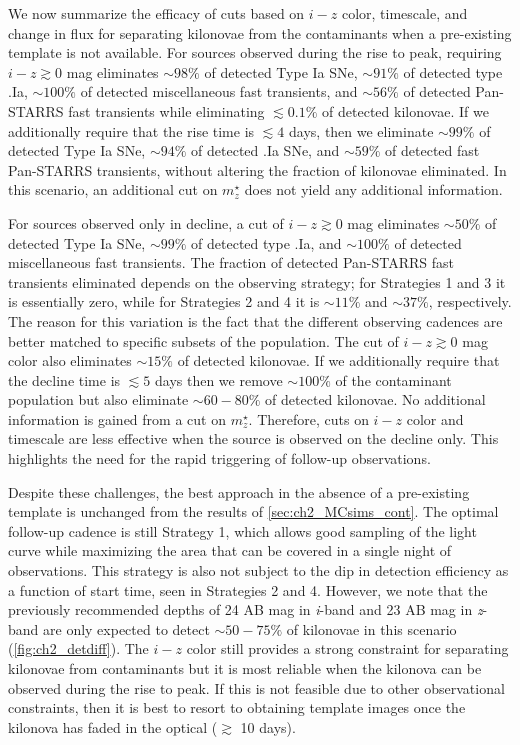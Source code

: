 We now summarize the efficacy of cuts based on $i-z$ color, timescale, and change in flux for separating kilonovae from the contaminants when a pre-existing template is not available. For sources observed during the rise to peak, requiring $i-z\gtrsim0$ mag eliminates $\sim98\%$ of detected Type Ia SNe, $\sim91\%$ of detected type .Ia, $\sim100\%$ of detected miscellaneous fast transients, and $\sim 56\%$ of detected Pan-STARRS fast transients while eliminating $\lesssim0.1\%$ of detected kilonovae. If we additionally require that the rise time is $\lesssim4$ days, then we eliminate $\sim99\%$ of detected Type Ia SNe, $\sim94\%$ of detected .Ia SNe, and $\sim59\%$ of detected fast Pan-STARRS transients, without altering the fraction of kilonovae eliminated. In this scenario, an additional cut on $m^{\star}_z$ does not yield any additional information.

For sources observed only in decline, a cut of $i-z\gtrsim0$ mag eliminates $\sim50\%$ of detected Type Ia SNe, $\sim99\%$ of detected type .Ia, and $\sim 100\%$ of detected miscellaneous fast transients. The fraction of detected Pan-STARRS fast transients eliminated depends on the observing strategy; for Strategies 1 and 3 it is essentially zero, while for Strategies 2 and 4 it is $\sim11\%$ and $\sim37\%$, respectively. The reason for this variation is the fact that the different observing cadences are better matched to specific subsets of the population. The cut of $i-z\gtrsim0$ mag color also eliminates $\sim 15\%$ of detected kilonovae. If we additionally require that the decline time is $\lesssim 5$ days then we remove $\sim100\%$ of the contaminant population but also eliminate $\sim60-80\%$ of detected kilonovae. No additional information is gained from a cut on $m^{\star}_z$. Therefore, cuts on $i-z$ color and timescale are less effective when the source is observed on the decline only. This highlights the need for the rapid triggering of follow-up observations.

Despite these challenges, the best approach in the absence of a pre-existing template is unchanged from the results of \autoref{sec:ch2_MCsims_cont}. The optimal follow-up cadence is still Strategy 1, which allows good sampling of the light curve while maximizing the area that can be covered in a single night of observations. This strategy is also not subject to the dip in detection efficiency as a function of start time, seen in Strategies 2 and 4. However, we note that the previously recommended depths of 24 AB mag in {\em i}-band and 23 AB mag in {\em z}-band are only expected to detect $\sim50-75\%$ of kilonovae in this scenario (\autoref{fig:ch2_detdiff}). The $i-z$ color still provides a strong constraint for separating kilonovae from contaminants but it is most reliable when the kilonova can be observed during the rise to peak. If this is not feasible due to other observational constraints, then it is best to resort to obtaining template images once the kilonova has faded in the optical ($\gtrsim$ 10 days).

